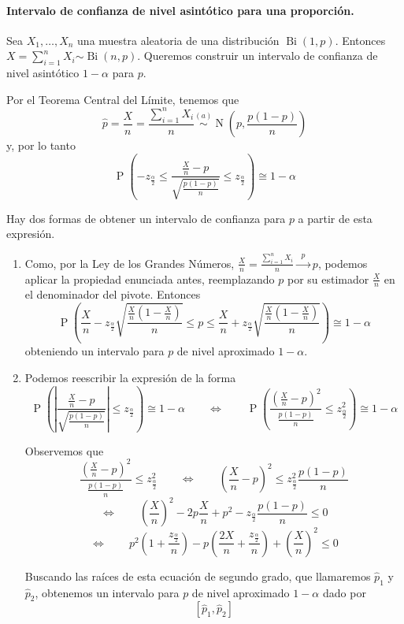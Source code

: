 \documentclass[11pt]{article}
\theoremstyle{plain}
\theoremstyle{definition}
\theoremstyle{remark}
\newcommand{\proba}{\ensuremath{\operatorname{P}}}  %
\newcommand{\dists}[1]{\ensuremath{\operatorname{#1}}}  %
\newcommand{\dist}[1]{\ensuremath{\sim \operatorname{#1}}}  %
\newcommand{\distt}[2]{\ensuremath{\overset{#1}{\sim} \operatorname{#2}}}  %
\newcommand{\tiende}[1]{\ensuremath{\xrightarrow{\;\; #1 \;\;}}}  %
\begin{document}
      \paragraph{Intervalo de confianza de nivel asintótico para una proporción.}

        Sea $X_1, \dots, X_n$ una muestra aleatoria de una distribución $\dists{Bi}(1,p)$. Entonces $X = \sum_{i=1}^n X_i \dist{Bi}(n,p)$. Queremos construir un intervalo de confianza de nivel asintótico $1 - \alpha$ para $p$.

        Por el Teorema Central del Límite, tenemos que
        \[ \hat p = \frac{X}{n} = \frac{\sum_{i=1}^n X_i}{n} \distt{(a)}{N}\left( p,\frac{p(1 - p)}{n} \right) \]
        y, por lo tanto
        \[ \proba \left( -z_{\frac{\alpha}{2}} \leq \frac{\frac{X}{n} - p}{\sqrt{\frac{p(1 - p)}{n}}} \leq z_{\frac{\alpha}{2}} \right) \cong 1 - \alpha \]

        Hay dos formas de obtener un intervalo de confianza para $p$ a partir de esta expresión.

        \begin{enumerate}
          \item Como, por la Ley de los Grandes Números, $\frac{X}{n} = \frac{\sum_{i=1}^{n} X_i}{n} \tiende{p} p$, podemos aplicar la propiedad enunciada antes, reemplazando $p$ por su estimador $\frac{X}{n}$ en el denominador del pivote. Entonces
          \[ \proba \left( \frac{X}{n} - z_{\frac{\alpha}{2}} \sqrt{\frac{\frac{X}{n} \left( 1 - \frac{X}{n} \right)}{n}} \leq p \leq \frac{X}{n} + z_{\frac{\alpha}{2}} \sqrt{\frac{\frac{X}{n} \left( 1 - \frac{X}{n} \right)}{n}} \right) \cong 1 - \alpha \]
          obteniendo un intervalo para $p$ de nivel aproximado $1 - \alpha$.
          \item Podemos reescribir la expresión de la forma
          \[ \proba \left( \left| \frac{\frac{X}{n} - p}{\sqrt{\frac{p(1 - p)}{n}}} \right| \leq z_{\frac{\alpha}{2}} \right) \cong 1 - \alpha \qquad \Leftrightarrow \qquad \proba \left( \frac{\left( \frac{X}{n} - p \right)^2}{\frac{p(1 - p)}{n}} \leq z_{\frac{\alpha}{2}}^2 \right) \cong 1 - \alpha \]

          Observemos que
          \[ \frac{\left( \frac{X}{n} - p \right)^2}{\frac{p(1 - p)}{n}} \leq z_{\frac{\alpha}{2}}^2 \qquad \Leftrightarrow \qquad \left( \frac{X}{n} - p \right)^2 \leq z_{\frac{\alpha}{2}}^2 \frac{p(1 - p)}{n} \]
          \[ \Leftrightarrow \qquad \left( \frac{X}{n} \right)^2 - 2 p \frac{X}{n} + p^2 - z_{\frac{\alpha}{2}} \frac{p(1 - p)}{n} \leq 0 \]
          \[ \Leftrightarrow \qquad p^2 \left( 1 + \frac{z_{\frac{\alpha}{2}}}{n} \right) - p \left( \frac{2X}{n} + \frac{z_{\frac{\alpha}{2}}}{n} \right) + \left( \frac{X}{n} \right)^2 \leq 0 \]

          Buscando las raíces de esta ecuación de segundo grado, que llamaremos $\hat p_1$ y $\hat p_2$, obtenemos un intervalo para $p$ de nivel aproximado $1 - \alpha$ dado por
          \[ [\hat p_1, \hat p_2] \]

        \end{enumerate}
\end{document}
